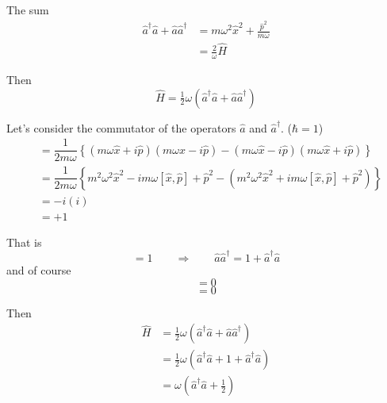 \documentclass{article}
\begin{document}
\noindent The sum
\begin{align}
\hat{a}^\dagger \hat{a} + \hat{a} \hat{a}^\dagger &= m \omega^2 \hat{x}^2 + \frac{\hat{p}^2}{ m \omega } \nonumber\\
&= \tfrac{2}{\omega} \hat{H}
\end{align}

\noindent Then
\begin{equation}
\hat{H} = \tfrac{1}{2} \omega ( \hat{a}^\dagger \hat{a} + \hat{a} \hat{a}^\dagger )
\end{equation}


\noindent Let's consider the commutator of the operators $\hat{a}$ and $\hat{a}^\dagger$. ($\hbar = 1$)
\begin{align}
[ \hat{a}, \hat{a}^\dagger ] &= \dfrac{1}{2 m \omega} \left\lbrace ( m \omega \hat{x} + i \hat{p} ) ( m \omega \hat{x} - i \hat{p} ) - ( m \omega \hat{x} - i \hat{p} ) ( m \omega \hat{x} + i \hat{p} ) \right\rbrace \nonumber\\
&= \dfrac{1}{2 m \omega} \left\lbrace m^2 \omega^2 \hat{x}^2 - i m \omega [ \hat{x}, \hat{p} ] + \hat{p}^2 - ( m^2 \omega^2 \hat{x}^2 + i m \omega [ \hat{x}, \hat{p} ] + \hat{p}^2 ) \right\rbrace \nonumber\\
&= -i ( i ) \nonumber\\
&= +1
\end{align}

\noindent That is
\begin{equation}
[ \hat{a}, \hat{a}^\dagger ] = 1 \qquad \Rightarrow \qquad \hat{a} \hat{a}^\dagger = 1 + \hat{a}^\dagger \hat{a}
\end{equation}
and of course
\begin{equation}
[ \hat{a}, \hat{a} ] = 0
\end{equation}
\begin{equation}
[ \hat{a}^\dagger, \hat{a}^\dagger ] = 0
\end{equation}

\noindent Then
\begin{align}
\hat{H} &= \tfrac{1}{2} \omega ( \hat{a}^\dagger \hat{a} + \hat{a} \hat{a}^\dagger ) \nonumber\\
&= \tfrac{1}{2} \omega ( \hat{a}^\dagger \hat{a} + 1 + \hat{a}^\dagger \hat{a} ) \nonumber\\
&= \omega ( \hat{a}^\dagger \hat{a} + \tfrac{1}{2} )
\end{align}

\end{document}
